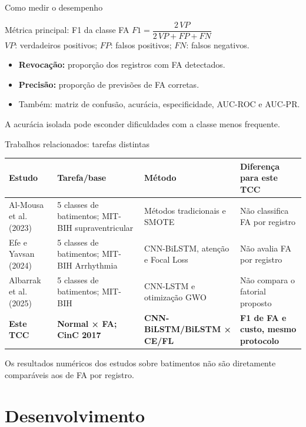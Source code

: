 \documentclass[aspectratio=169,12pt,brazil]{beamer}
\begin{document}
\begin{frame}{Como medir o desempenho}
  \begin{block}{Métrica principal: F1 da classe FA}
    \centering $F1=\dfrac{2\,VP}{2\,VP+FP+FN}$\\
    \scriptsize $VP$: verdadeiros positivos; $FP$: falsos positivos; $FN$: falsos negativos.
  \end{block}
  \begin{itemize}
    \item \textbf{Revocação:} proporção dos registros com FA detectados.
    \item \textbf{Precisão:} proporção de previsões de FA corretas.
    \item Também: matriz de confusão, acurácia, especificidade, AUC-ROC e AUC-PR.
  \end{itemize}
  \small A acurácia isolada pode esconder dificuldades com a classe menos frequente.
\end{frame}

\begin{frame}{Trabalhos relacionados: tarefas distintas}
  \scriptsize
  \begin{tabular}{p{2.1cm}p{3.05cm}p{3.7cm}p{3.1cm}}
    \toprule
    \textbf{Estudo} & \textbf{Tarefa/base} & \textbf{Método} & \textbf{Diferença para este TCC} \\
    \midrule
    Al-Mousa et al. (2023) & 5 classes de batimentos; MIT-BIH supraventricular & Métodos tradicionais e SMOTE & Não classifica FA por registro \\
    Efe e Yavsan (2024) & 5 classes de batimentos; MIT-BIH Arrhythmia & CNN-BiLSTM, atenção e Focal Loss & Não avalia FA por registro \\
    Albarrak et al. (2025) & 5 classes de batimentos; MIT-BIH & CNN-LSTM e otimização GWO & Não compara o fatorial proposto \\
    \midrule
    \textbf{Este TCC} & \textbf{Normal × FA; CinC 2017} & \textbf{CNN-BiLSTM/BiLSTM × CE/FL} & \textbf{F1 de FA e custo, mesmo protocolo} \\
    \bottomrule
  \end{tabular}
  \vspace{.2cm}

  \small Os resultados numéricos dos estudos sobre batimentos não são diretamente comparáveis aos de FA por registro.
\end{frame}

\section{Desenvolvimento}
\end{document}
